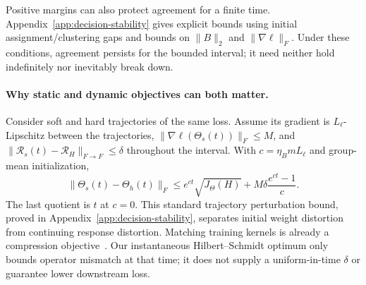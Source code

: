Positive margins can also protect agreement for a finite time.
Appendix~\ref{app:decision-stability} gives explicit bounds using initial
assignment/clustering gaps and bounds on $\|B\|_2$ and
$\|\nabla\ell\|_F$. Under these conditions, agreement persists for the bounded interval;
it need neither hold indefinitely nor inevitably break down.

\paragraph{Why static and dynamic objectives can both matter.}
Consider soft and hard trajectories of the same loss. Assume its gradient
is $L_\ell$-Lipschitz between the trajectories,
$\|\nabla\ell(\Theta_s(t))\|_F\le M$, and
$\|\mathcal R_s(t)-\mathcal R_H\|_{F\to F}\le\delta$ throughout the
interval. With $c=\eta_BmL_\ell$ and group-mean initialization,
\begin{equation}
 \|\Theta_s(t)-\Theta_h(t)\|_F
 \le e^{ct}\sqrt{J_\Theta(H)}
       +M\delta\frac{e^{ct}-1}{c}. \label{eq:trajectory-sharing-bound}
\end{equation}
The last quotient is $t$ at $c=0$. This standard trajectory perturbation
bound, proved in Appendix~\ref{app:decision-stability}, separates initial
weight distortion from continuing response distortion. Matching training
kernels is already a compression objective~\citep{pmlr-v119-liu20o}.
Our instantaneous Hilbert--Schmidt optimum only bounds operator mismatch
at that time; it does not supply a uniform-in-time $\delta$ or guarantee
lower downstream loss.
